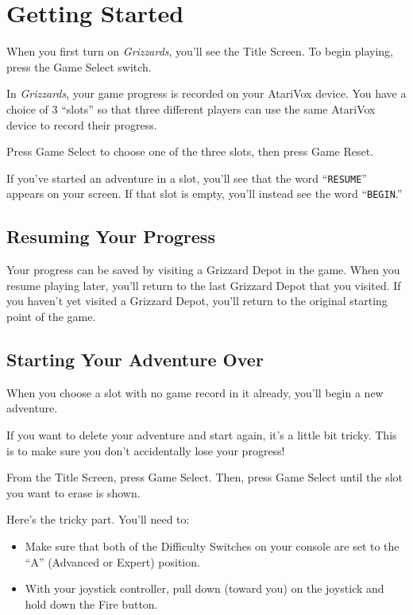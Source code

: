 \documentclass[12pt,twoside,openright,book]{memoir}
\begin{document}
\fi

\chapter{Getting Started}\label{Getting Started}

When you first turn on \textit{Grizzards}, you'll see the Title Screen.
To begin playing, press the Game Select switch.

In \textit{Grizzards}, your game  progress is recorded on your AtariVox
device. You have a choice of 3 ``slots'' so that three different players
can use the same AtariVox device to record their progress.

Press  Game  Select  to  choose  one of  the  three  slots,  then  press
Game Reset.

If  you've started  an adventure  in a  slot, you'll  see that  the word
``\texttt{RESUME}'' appears on your screen. If that slot is empty, you'll instead
see the word ``\texttt{BEGIN}.''

\section{Resuming Your Progress}

Your progress  can be saved  by visiting a  Grizzard Depot in  the game.
When you resume playing later, you'll  return to the last Grizzard Depot
that you  visited. If you haven't  yet visited a Grizzard  Depot, you'll
return to the original starting point of the game.

\section{Starting Your Adventure Over}\label{Starting Your Adventure Over}

When you choose a  slot with no game record in  it already, you'll begin
a new adventure.

If you want to delete your adventure  and start again, it's a little bit
tricky. This is to make sure you don't accidentally lose your progress!

From the Title Screen, press Game  Select. Then, press Game Select until
the slot you want to erase is shown.

Here's the tricky part. You'll need to:

\begin{itemize}
\item Make sure that both of the Difficulty Switches on your console
  are set to the ``A'' (Advanced or Expert) position.
\item With your joystick controller, pull down (toward you) on the
  joystick and hold down the Fire button.
\end{itemize}
\end{document}
